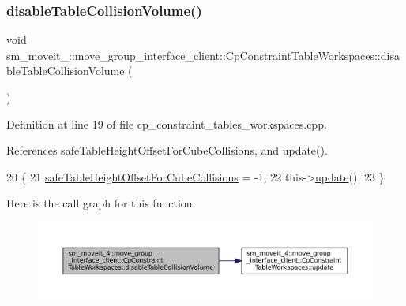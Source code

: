 \subsubsection{\texorpdfstring{disable\+Table\+Collision\+Volume()}{disableTableCollisionVolume()}}
{\footnotesize\ttfamily void sm\+\_\+moveit\+\_\+::move\+\_\+group\+\_\+interface\+\_\+client\+::\+Cp\+Constraint\+Table\+Workspaces\+::disable\+Table\+Collision\+Volume (\begin{DoxyParamCaption}{ }\end{DoxyParamCaption})}



Definition at line 19 of file cp\+\_\+constraint\+\_\+tables\+\_\+workspaces.\+cpp.



References safe\+Table\+Height\+Offset\+For\+Cube\+Collisions, and update().


\begin{DoxyCode}
20         \{
21             \hyperlink{classsm__moveit__4_1_1move__group__interface__client_1_1CpConstraintTableWorkspaces_a3f9ba91578890ba9a146c678e3630d9f}{safeTableHeightOffsetForCubeCollisions} = -1;
22             this->\hyperlink{classsm__moveit__4_1_1move__group__interface__client_1_1CpConstraintTableWorkspaces_a7d7ed0c25f8d40392a977160ae3123a7}{update}();
23         \}
\end{DoxyCode}
Here is the call graph for this function\+:
\nopagebreak
\begin{figure}[H]
\begin{center}
\leavevmode
\includegraphics[width=350pt]{classsm__moveit__4_1_1move__group__interface__client_1_1CpConstraintTableWorkspaces_abc1d95f8b46629dc7caa0d7b5be0a7b9_cgraph}
\end{center}
\end{figure}
\mbox{\label{classsm__moveit__4_1_1move__group__interface__client_1_1CpConstraintTableWorkspaces_a0c9f51a8752aac05a6d2f1e00d06a34e}} 
